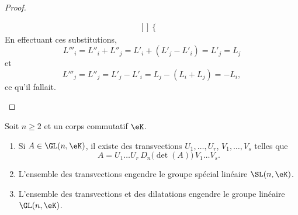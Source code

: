 \begin{proof}
\begin{subproof}
\begin{equation}
\begin{aligned}[]
\begin{cases}
                \end{cases}
                \end{aligned}
            \end{equation}
            En effectuant ces substitutions,
            \begin{equation}
                L'''_i=L''_i+L''_j=L'_i+(L'_j-L'_i)=L'_j=L_j
            \end{equation}
            et
            \begin{equation}
                L'''_j=L''_j=L'_j-L'_i=L_j-(L_i+L_j)=-L_i,
            \end{equation}
            ce qu'il fallait.
    \end{subproof}
\end{proof}

\begin{proposition}      \label{PropooFDNRooWFfUDd}
    Soit \( n\geq 2\) et un corps commutatif \( \eK\).
    \begin{enumerate}
        \item
            Si \( A\in \GL(n,\eK)\), il existe des transvections \( U_1,\ldots, U_r\), \( V_1,\ldots, V_s\) telles que
                \begin{equation}        \label{EQooKSQVooIpkdIE}
                    A=U_1\ldots U_r\,D_n\big( \det(A) \big)\,V_1\ldots V_s.
                \end{equation}
        \item       \label{ITEMooLRYXooSoKRiA}
            L'ensemble des transvections engendre le groupe spécial linéaire \( \SL(n,\eK)\).
        \item
            L'ensemble des transvections et des dilatations engendre le groupe linéaire \( \GL(n,\eK)\).
    \end{enumerate}
\end{proposition}

